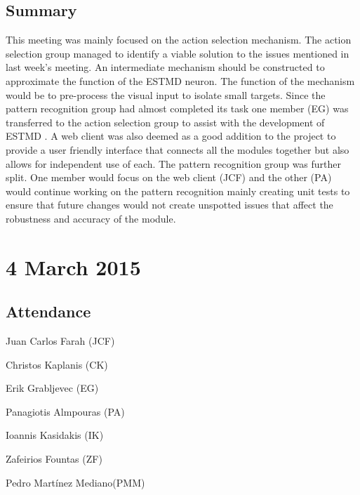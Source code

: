\documentclass[a4paper,11pt]{article}
\begin{document}
\subsection*{Summary}
This meeting was mainly focused on the action selection mechanism. The action selection group managed to identify a viable solution to the issues mentioned in last week's meeting. An intermediate mechanism should be constructed to approximate the function of the ESTMD neuron. The function of the mechanism would be to pre-process the visual input to isolate small targets. Since the pattern recognition group had almost completed its task one member (EG) was transferred to the action selection group to assist with the development of  ESTMD . A web client was also deemed as a good addition to the project to provide a user friendly interface that connects all the modules together but also allows for independent use of each. The pattern recognition group was further split. One member would focus on the web client (JCF) and the other (PA) would continue working on the pattern recognition mainly creating unit tests to ensure that future changes would not create unspotted issues that affect the robustness and accuracy of the module.

\maketitle
\section*{4 March 2015}
\subsection*{Attendance}
\begin{compactenum}
\item Juan Carlos Farah (JCF)
\item Christos Kaplanis (CK)
\item Erik Grabljevec (EG)
\item Panagiotis Almpouras (PA)
\item Ioannis Kasidakis (IK)
\item Zafeirios Fountas (ZF)
\item Pedro Martínez Mediano(PMM)
\end{compactenum}
\end{document}

